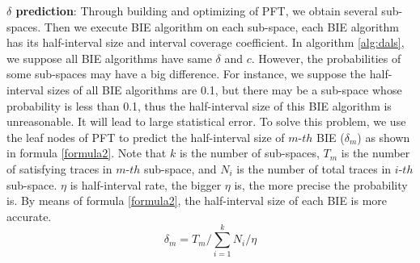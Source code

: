 \textbf{$\delta$ prediction}:
Through building and optimizing of PFT, we obtain several sub-spaces. Then we execute BIE algorithm on each sub-space, each BIE algorithm has its half-interval size and interval coverage coefficient. In algorithm \ref{alg:dals}, we suppose all BIE algorithms have same $\delta$ and $c$. However, the probabilities of some sub-spaces may have a big difference. For instance, we suppose the half-interval sizes of all BIE algorithms are 0.1, but there may be a sub-space whose probability is less than 0.1, thus the half-interval size of this BIE algorithm is unreasonable. It will lead to large statistical error. To solve this problem, we use the leaf nodes of PFT to predict the half-interval size of $m$-$th$ BIE ($\delta_m$) as shown in formula \ref{formula2}. Note that $k$ is the number of sub-spaces, $T_m$ is the number of satisfying traces in $m$-$th$ sub-space, and $N_i$ is the number of total traces in $i$-$th$ sub-space. $\eta$ is half-interval rate, the bigger $\eta$ is, the more precise the probability is. By means of formula \ref{formula2}, the half-interval size of each BIE is more accurate.
\begin{equation}
\label{formula2}
\delta_m = T_m / \sum\limits_{i=1}^k N_i / \eta
\end{equation}
